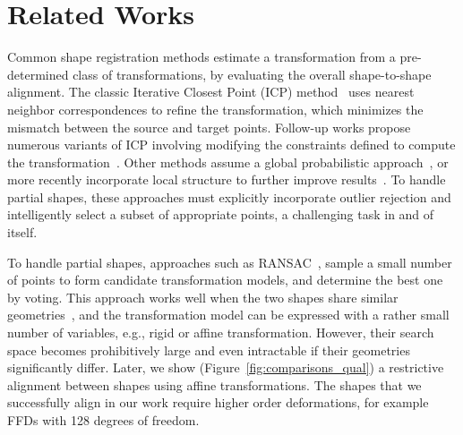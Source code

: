 \documentclass[acmtog,timestamp]{acmart}%
\begin{document}
\section{Related Works}%
Common shape registration methods estimate a transformation from a pre-determined class of transformations, by evaluating the overall shape-to-shape alignment. The classic Iterative Closest Point (ICP) method~\cite{ICP} uses nearest neighbor correspondences to refine the transformation, which minimizes the mismatch between the source and target points. Follow-up works propose numerous variants of ICP involving modifying the constraints defined to compute the transformation~\cite{ICPVariants_Levoy2001}. Other methods assume a global probabilistic approach~\cite{CPD,Jian2011,Tsin2004}, or more recently incorporate local structure to further improve results~\cite{ma2014robust,ma2016non}. To handle partial shapes, these approaches must explicitly incorporate outlier rejection and intelligently select a subset of appropriate points, a challenging task in and of itself.

To handle partial shapes, approaches such as RANSAC~\cite{RANSAC}, sample a small number of points to form candidate transformation models, and determine the best one by voting. This approach works well when the two shapes share similar geometries~\cite{amo_fpcs_sig_08}, and the transformation model can be expressed with a rather small number of variables, e.g., rigid or affine transformation. However, their search space becomes prohibitively large and even intractable if their geometries significantly differ. Later, we show (Figure~\ref{fig:comparisons_qual}) a restrictive alignment between shapes using affine transformations. The shapes that we successfully align in our work require higher order deformations, for example FFDs with 128 degrees of freedom.
\end{document}

